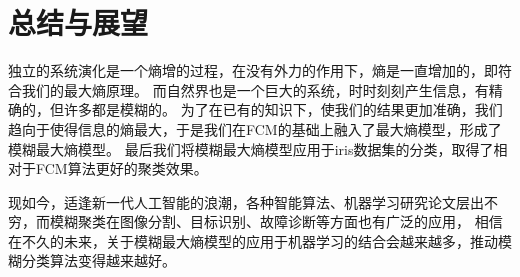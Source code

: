 \chapter{总结与展望}
\par 
独立的系统演化是一个熵增的过程，在没有外力的作用下，熵是一直增加的，即符合我们的最大熵原理。
而自然界也是一个巨大的系统，时时刻刻产生信息，有精确的，但许多都是模糊的。
为了在已有的知识下，使我们的结果更加准确，我们趋向于使得信息的熵最大，于是我们在FCM的基础上融入了最大熵模型，形成了模糊最大熵模型。
最后我们将模糊最大熵模型应用于iris数据集的分类，取得了相对于FCM算法更好的聚类效果。
\par
现如今，适逢新一代人工智能的浪潮，各种智能算法、机器学习研究论文层出不穷，而模糊聚类在图像分割、目标识别、故障诊断等方面也有广泛的应用，
相信在不久的未来，关于模糊最大熵模型的应用于机器学习的结合会越来越多，推动模糊分类算法变得越来越好。